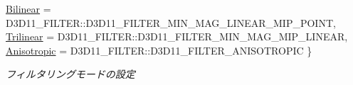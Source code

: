\begin{DoxyCompactItemize}
\hyperlink{class_a_p_i_1_1abstract_a520ef65de715096fdca5c71afa9273a1a657ab5c6571e53d74c63110cc8448c8b}{Bilinear} = D3\+D11\+\_\+\+F\+I\+L\+T\+ER\+:\+:D3\+D11\+\_\+\+F\+I\+L\+T\+E\+R\+\_\+\+M\+I\+N\+\_\+\+M\+A\+G\+\_\+\+L\+I\+N\+E\+A\+R\+\_\+\+M\+I\+P\+\_\+\+P\+O\+I\+NT, 
\hyperlink{class_a_p_i_1_1abstract_a520ef65de715096fdca5c71afa9273a1ab9db546b92309fcc8cfd67b7b6bbe8d2}{Trilinear} = D3\+D11\+\_\+\+F\+I\+L\+T\+ER\+:\+:D3\+D11\+\_\+\+F\+I\+L\+T\+E\+R\+\_\+\+M\+I\+N\+\_\+\+M\+A\+G\+\_\+\+M\+I\+P\+\_\+\+L\+I\+N\+E\+AR, 
\hyperlink{class_a_p_i_1_1abstract_a520ef65de715096fdca5c71afa9273a1a22690afbc2ee3a3ba2a141ab906f273c}{Anisotropic} = D3\+D11\+\_\+\+F\+I\+L\+T\+ER\+:\+:D3\+D11\+\_\+\+F\+I\+L\+T\+E\+R\+\_\+\+A\+N\+I\+S\+O\+T\+R\+O\+P\+IC
 \}\begin{DoxyCompactList}\small\item\em フィルタリングモードの設定 \end{DoxyCompactList}
\end{DoxyCompactItemize}
